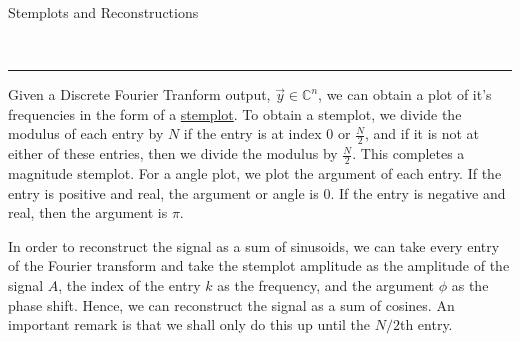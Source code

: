 \documentclass{article}
\newcommand{\header}[1]{\begin{large}\noindent #1\end{large}\\\rule{\textwidth}{0.5pt}}
\begin{document}
\header{Stemplots and Reconstructions}

Given a Discrete Fourier Tranform output, $\vec{y} \in \mathbb{C}^n$, we can obtain a plot
of it's frequencies in the form of a \underline{stemplot}. To obtain a stemplot, we 
divide the modulus of each entry by $N$ if the entry is at index 0 or $\frac{N}{2}$, and if it is not
at either of these entries, then we divide the modulus by $\frac{N}{2}$. This completes 
a magnitude stemplot. For a angle plot, we plot the argument of each entry. If the entry is 
positive and real, the argument or angle is 0. If the entry is negative and real, then 
the argument is $\pi$.

In order to reconstruct the signal as a sum of sinusoids, we can take every entry of the 
Fourier transform and take the stemplot amplitude as the amplitude of the signal $A$, the 
index of the entry $k$ as the frequency, and the argument $\phi$ as the phase shift.
Hence, we can reconstruct the signal as a sum of cosines. An important remark is that 
we shall only do this up until the $N/2$th entry.
\end{document}
